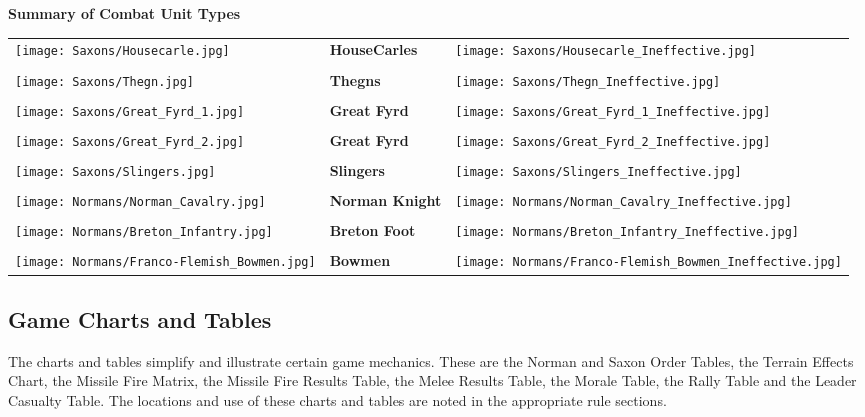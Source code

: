 \par
\begin{center}
  \textbf{Summary of Combat Unit Types}
  \break
\end{center}

\begin{tabularx}{0.5\textwidth}{
    >{\raggedright\arraybackslash}X
    >{\centering\arraybackslash}X
    >{\raggedleft\arraybackslash}X}

  \texttt{[image: Saxons/Housecarle.jpg]} & \textbf{HouseCarles} & \texttt{[image: Saxons/Housecarle\_Ineffective.jpg]} \\ \\
  \texttt{[image: Saxons/Thegn.jpg]} & \textbf{Thegns} & \texttt{[image: Saxons/Thegn\_Ineffective.jpg]} \\ \\
  \texttt{[image: Saxons/Great\_Fyrd\_1.jpg]} & \textbf{Great Fyrd} & \texttt{[image: Saxons/Great\_Fyrd\_1\_Ineffective.jpg]} \\ \\
  \texttt{[image: Saxons/Great\_Fyrd\_2.jpg]} & \textbf{Great Fyrd} & \texttt{[image: Saxons/Great\_Fyrd\_2\_Ineffective.jpg]} \\ \\
  \texttt{[image: Saxons/Slingers.jpg]} & \textbf{Slingers} & \texttt{[image: Saxons/Slingers\_Ineffective.jpg]} \\ \\
  \texttt{[image: Normans/Norman\_Cavalry.jpg]} & \textbf{Norman Knight} & \texttt{[image: Normans/Norman\_Cavalry\_Ineffective.jpg]} \\ \\
  \texttt{[image: Normans/Breton\_Infantry.jpg]} & \textbf{Breton Foot} & \texttt{[image: Normans/Breton\_Infantry\_Ineffective.jpg]} \\ \\
  \texttt{[image: Normans/Franco-Flemish\_Bowmen.jpg]} & \textbf{Bowmen} & \texttt{[image: Normans/Franco-Flemish\_Bowmen\_Ineffective.jpg]}
\end{tabularx}

\subsection{Game Charts and Tables}


The charts and tables simplify and illustrate certain game mechanics. These are the Norman and Saxon Order Tables, the Terrain Effects Chart, the Missile Fire Matrix, the Missile Fire Results Table, the Melee Results Table, the Morale Table, the Rally Table and the Leader Casualty Table. The locations and use of these charts and tables are noted in the appropriate rule sections.

